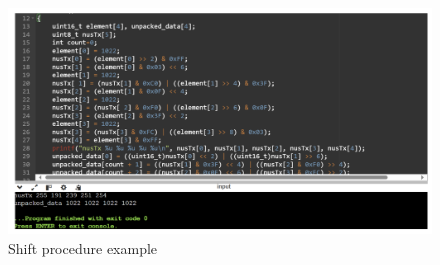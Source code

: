 \documentclass{Configuration_Files/PoliMi3i_thesis}
\begin{document}
\begin{figure}[H]
    \centering
    \includegraphics[scale=0.7]{Shift Algorithm/Screenshot 2024-07-22 at 22.32.05.png}
    \caption{Shift procedure example}
    \label{pairing_procedure_7}
\end{figure}
\end{document}
